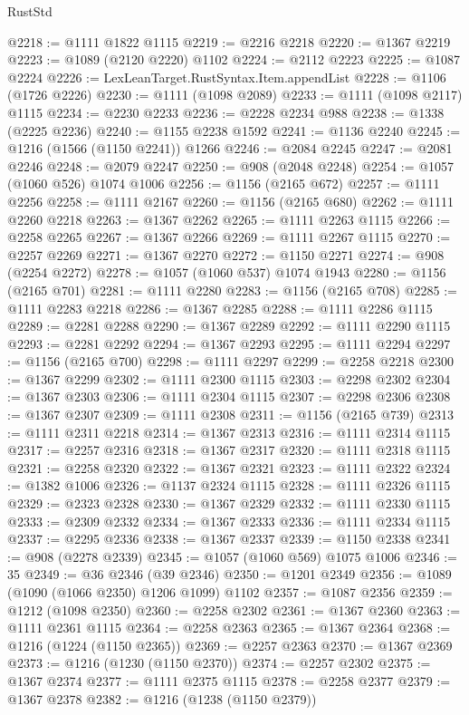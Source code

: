 \begin{lexlean}{RustStd}
\begin{coremodule}
@2218 := @1111 @1822 @1115
@2219 := @2216 @2218
@2220 := @1367 @2219
@2223 := @1089 (@2120 @2220) @1102
@2224 := @2112 @2223
@2225 := @1087 @2224
@2226 := LexLeanTarget.RustSyntax.Item.appendList
@2228 := @1106 (@1726 @2226)
@2230 := @1111 (@1098 @2089)
@2233 := @1111 (@1098 @2117) @1115
@2234 := @2230 @2233
@2236 := @2228 @2234 @988
@2238 := @1338 (@2225 @2236)
@2240 := @1155 @2238 @1592
@2241 := @1136 @2240
@2245 := @1216 (@1566 (@1150 @2241)) @1266
@2246 := @2084 @2245
@2247 := @2081 @2246
@2248 := @2079 @2247
@2250 := @908 (@2048 @2248)
@2254 := @1057 (@1060 @526) @1074 @1006
@2256 := @1156 (@2165 @672)
@2257 := @1111 @2256
@2258 := @1111 @2167
@2260 := @1156 (@2165 @680)
@2262 := @1111 @2260 @2218
@2263 := @1367 @2262
@2265 := @1111 @2263 @1115
@2266 := @2258 @2265
@2267 := @1367 @2266
@2269 := @1111 @2267 @1115
@2270 := @2257 @2269
@2271 := @1367 @2270
@2272 := @1150 @2271
@2274 := @908 (@2254 @2272)
@2278 := @1057 (@1060 @537) @1074 @1943
@2280 := @1156 (@2165 @701)
@2281 := @1111 @2280
@2283 := @1156 (@2165 @708)
@2285 := @1111 @2283 @2218
@2286 := @1367 @2285
@2288 := @1111 @2286 @1115
@2289 := @2281 @2288
@2290 := @1367 @2289
@2292 := @1111 @2290 @1115
@2293 := @2281 @2292
@2294 := @1367 @2293
@2295 := @1111 @2294
@2297 := @1156 (@2165 @700)
@2298 := @1111 @2297
@2299 := @2258 @2218
@2300 := @1367 @2299
@2302 := @1111 @2300 @1115
@2303 := @2298 @2302
@2304 := @1367 @2303
@2306 := @1111 @2304 @1115
@2307 := @2298 @2306
@2308 := @1367 @2307
@2309 := @1111 @2308
@2311 := @1156 (@2165 @739)
@2313 := @1111 @2311 @2218
@2314 := @1367 @2313
@2316 := @1111 @2314 @1115
@2317 := @2257 @2316
@2318 := @1367 @2317
@2320 := @1111 @2318 @1115
@2321 := @2258 @2320
@2322 := @1367 @2321
@2323 := @1111 @2322
@2324 := @1382 @1006
@2326 := @1137 @2324 @1115
@2328 := @1111 @2326 @1115
@2329 := @2323 @2328
@2330 := @1367 @2329
@2332 := @1111 @2330 @1115
@2333 := @2309 @2332
@2334 := @1367 @2333
@2336 := @1111 @2334 @1115
@2337 := @2295 @2336
@2338 := @1367 @2337
@2339 := @1150 @2338
@2341 := @908 (@2278 @2339)
@2345 := @1057 (@1060 @569) @1075 @1006
@2346 := 35
@2349 := @36 @2346 (@39 @2346)
@2350 := @1201 @2349
@2356 := @1089 (@1090 (@1066 @2350) @1206 @1099) @1102
@2357 := @1087 @2356
@2359 := @1212 (@1098 @2350)
@2360 := @2258 @2302
@2361 := @1367 @2360
@2363 := @1111 @2361 @1115
@2364 := @2258 @2363
@2365 := @1367 @2364
@2368 := @1216 (@1224 (@1150 @2365))
@2369 := @2257 @2363
@2370 := @1367 @2369
@2373 := @1216 (@1230 (@1150 @2370))
@2374 := @2257 @2302
@2375 := @1367 @2374
@2377 := @1111 @2375 @1115
@2378 := @2258 @2377
@2379 := @1367 @2378
@2382 := @1216 (@1238 (@1150 @2379))

\end{coremodule}
\end{lexlean}
